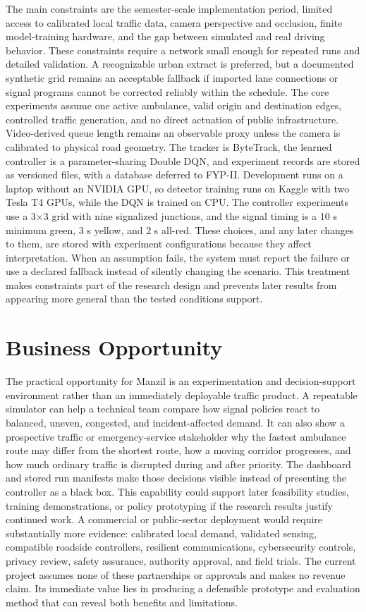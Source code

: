 The main constraints are the semester-scale implementation period, limited access to calibrated local traffic data, camera perspective and occlusion, finite model-training hardware, and the gap between simulated and real driving behavior. These constraints require a network small enough for repeated runs and detailed validation. A recognizable urban extract is preferred, but a documented synthetic grid remains an acceptable fallback if imported lane connections or signal programs cannot be corrected reliably within the schedule. The core experiments assume one active ambulance, valid origin and destination edges, controlled traffic generation, and no direct actuation of public infrastructure. Video-derived queue length remains an observable proxy unless the camera is calibrated to physical road geometry. The tracker is ByteTrack, the learned controller is a parameter-sharing Double DQN, and experiment records are stored as versioned files, with a database deferred to FYP-II. Development runs on a laptop without an NVIDIA GPU, so detector training runs on Kaggle with two Tesla T4 GPUs, while the DQN is trained on CPU. The controller experiments use a 3$\times$3 grid with nine signalized junctions, and the signal timing is a 10 s minimum green, 3 s yellow, and 2 s all-red. These choices, and any later changes to them, are stored with experiment configurations because they affect interpretation. When an assumption fails, the system must report the failure or use a declared fallback instead of silently changing the scenario. This treatment makes constraints part of the research design and prevents later results from appearing more general than the tested conditions support.

\section{Business Opportunity}

The practical opportunity for Manzil is an experimentation and decision-support environment rather than an immediately deployable traffic product. A repeatable simulator can help a technical team compare how signal policies react to balanced, uneven, congested, and incident-affected demand. It can also show a prospective traffic or emergency-service stakeholder why the fastest ambulance route may differ from the shortest route, how a moving corridor progresses, and how much ordinary traffic is disrupted during and after priority. The dashboard and stored run manifests make those decisions visible instead of presenting the controller as a black box. This capability could support later feasibility studies, training demonstrations, or policy prototyping if the research results justify continued work. A commercial or public-sector deployment would require substantially more evidence: calibrated local demand, validated sensing, compatible roadside controllers, resilient communications, cybersecurity controls, privacy review, safety assurance, authority approval, and field trials. The current project assumes none of these partnerships or approvals and makes no revenue claim. Its immediate value lies in producing a defensible prototype and evaluation method that can reveal both benefits and limitations.

